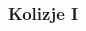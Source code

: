 \documentclass[aspectratio=169]{beamer}
\begin{document}
\begin{frame}%
	\frametitle{Kolizje I}
	\begin{columns}
		\begin{column}{0.45\textwidth}
	   	 	\begin{figure}
	   		 \centering
	    		\end{figure}
		\end{column}
		\begin{column}{0.55\textwidth}
	   	 	\begin{figure}
	   		 \centering
	    		\end{figure}
		\end{column}
	\end{columns}
\end{frame}
\end{document}
